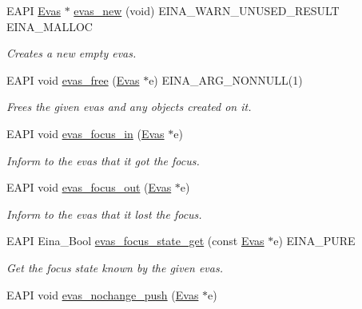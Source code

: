 \begin{DoxyCompactItemize}
EAPI \hyperlink{group__Evas__Canvas_ga5ff87cc4ce6bc43e3b640a6d37f73043}{Evas} $\ast$ \hyperlink{group__Evas__Canvas_ga9280ee6564c889348b142b8bcd723f87}{evas\_\-new} (void) EINA\_\-WARN\_\-UNUSED\_\-RESULT EINA\_\-MALLOC
\begin{DoxyCompactList}\small\item\em Creates a new empty evas. \item\end{DoxyCompactList}\item 
EAPI void \hyperlink{group__Evas__Canvas_ga45ab1883cc0b145bc3af130d3c00a21f}{evas\_\-free} (\hyperlink{group__Evas__Canvas_ga5ff87cc4ce6bc43e3b640a6d37f73043}{Evas} $\ast$e) EINA\_\-ARG\_\-NONNULL(1)
\begin{DoxyCompactList}\small\item\em Frees the given evas and any objects created on it. \item\end{DoxyCompactList}\item 
EAPI void \hyperlink{group__Evas__Canvas_gad4e5f592d23e74868f1e135c714a1acb}{evas\_\-focus\_\-in} (\hyperlink{group__Evas__Canvas_ga5ff87cc4ce6bc43e3b640a6d37f73043}{Evas} $\ast$e)
\begin{DoxyCompactList}\small\item\em Inform to the evas that it got the focus. \item\end{DoxyCompactList}\item 
EAPI void \hyperlink{group__Evas__Canvas_ga438b8a00339af4b25c84c4ef57d6b3ff}{evas\_\-focus\_\-out} (\hyperlink{group__Evas__Canvas_ga5ff87cc4ce6bc43e3b640a6d37f73043}{Evas} $\ast$e)
\begin{DoxyCompactList}\small\item\em Inform to the evas that it lost the focus. \item\end{DoxyCompactList}\item 
EAPI Eina\_\-Bool \hyperlink{group__Evas__Canvas_gab4822a733c10760b293006b77c4fc6d8}{evas\_\-focus\_\-state\_\-get} (const \hyperlink{group__Evas__Canvas_ga5ff87cc4ce6bc43e3b640a6d37f73043}{Evas} $\ast$e) EINA\_\-PURE
\begin{DoxyCompactList}\small\item\em Get the focus state known by the given evas. \item\end{DoxyCompactList}\item 
EAPI void \hyperlink{group__Evas__Canvas_ga6e49e2a2b27c306c265433ac7d3b5dbe}{evas\_\-nochange\_\-push} (\hyperlink{group__Evas__Canvas_ga5ff87cc4ce6bc43e3b640a6d37f73043}{Evas} $\ast$e)

\end{DoxyCompactItemize}
